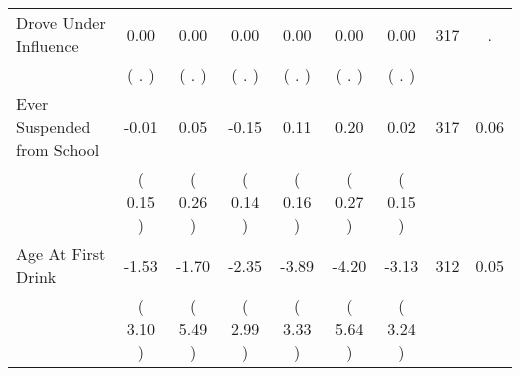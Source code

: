 \begin{tabular}{lcccccccc}
Drove Under Influence &      0.00 &      0.00 &      0.00 &      0.00 &      0.00 &      0.00 & 317 &          . \\ 
 & (        . ) & (        . ) & (        . ) & (        . ) & (        . ) & (        . ) & \\
Ever Suspended from School &     -0.01 &      0.05 &     -0.15 &      0.11 &      0.20 &      0.02 & 317 &       0.06 \\ 
 & (     0.15 ) & (     0.26 ) & (     0.14 ) & (     0.16 ) & (     0.27 ) & (     0.15 ) & \\
Age At First Drink &     -1.53 &     -1.70 &     -2.35 &     -3.89 &     -4.20 &     -3.13 & 312 &       0.05 \\ 
 & (     3.10 ) & (     5.49 ) & (     2.99 ) & (     3.33 ) & (     5.64 ) & (     3.24 ) & \\
\bottomrule
\end{tabular}
